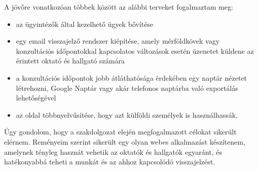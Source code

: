 \documentclass[
]{thesis-ekf}
\theoremstyle{definition}
\theoremstyle{remark}
\begin{document}
	A jövőre vonatkozóan többek között az alábbi terveket fogalmaztam meg: 
	\begin{itemize}
		\item az ügyintézők által kezelhető ügyek bővítése
		\item egy email visszajelző rendszer kiépítése, amely mérföldkövek vagy konzultációs időpontokkal kapcsolatos változások esetén üzenetet küldene az érintett oktató és hallgató számára
		\item a konzultációs időpontok jobb átláthatósága érdekében egy naptár nézetet létrehozni, Google Naptár vagy akár telefonos naptárba való exportálás lehetőségével
		\item az oldal többnyelvűsítése, hogy azt külföldi személyek is használhassák.
	\end{itemize}
	Úgy gondolom, hogy a szakdolgozat elején megfogalmazott célokat sikerült elérnem. Reményeim szerint sikerült egy olyan webes alkalmazást készítenem, amelynek tényleg hasznát vehetik az oktatók és hallgatók egyaránt, és hatékonyabbá teheti a munkát és az ahhoz kapcsolódó visszajelzést.
\end{document}
